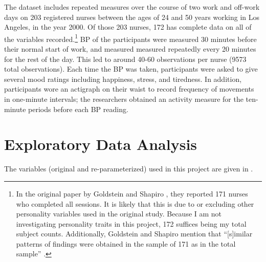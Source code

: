 \documentclass[12pt,twoside,leqno,fleqn,letterpaper]{article}
\theoremstyle{definition}
\theoremstyle{definition}
\begin{document}
The dataset includes repeated measures over the course of two work and off-work days on 203 registered nurses between the ages of 24 and 50 years working in Los Angeles, in the year 2000. Of those 203 nurses, 172 has complete data on all of the variables recorded.\footnote{In the original paper by Goldstein and Shapiro , they reported 171 nurses who completed all sessions. It is likely that this is due to \citet{roback_beyond_2021} or \citet{weiss_modeling_2005} excluding other personality variables used in the original study. Because I am not investigating personality traits in this project, 172 suffices being my total subject counts. Additionally, Goldstein and Shapiro  mention that ``[s]imilar patterns of findings were obtained in the sample of 171 as in the total sample'' .} BP of the participants were measured 30 minutes before their normal start of work, and measured measured repeatedly every 20 minutes for the rest of the day. This led to around 40-60 observations per nurse (9573 total observations). Each time the BP was taken, participants were asked to give several mood ratings including happiness, stress, and tiredness. In addition, participants wore an actigraph on their waist to record frequency of movements in one-minute intervals; the researchers obtained an activity measure for the ten-minute periods before each BP reading.

\section{Exploratory Data Analysis}

The variables (original and re-parameterized) used in this project are given in .
\end{document}
